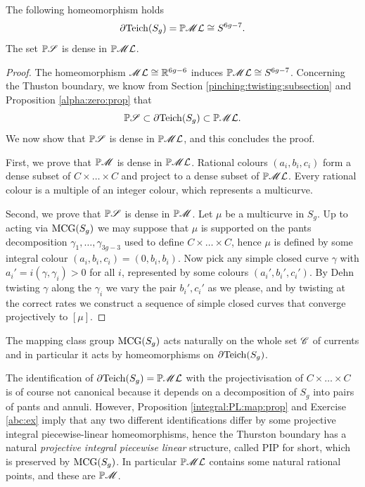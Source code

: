 \begin{teo}
The following homeomorphism holds
$$\partial {\rm Teich}(S_g) = \mathbb{P}\mathscr{M}\mathcal{L} \cong S^{6g-7}.$$ 
The set $\mathbb{P}\mathscr{S}$ is dense in $\mathbb{P}\mathscr{M}\mathcal{L}$.
\end{teo}
\begin{proof}
The homeomorphism $\mathscr{M}\mathcal{L} \cong \mathbb{R}^{6g-6}$ induces $\mathbb{P}\mathscr{M}\mathcal{L} \cong S^{6g-7}$. Concerning the Thuston boundary, we know from Section \ref{pinching:twisting:subsection} and Proposition \ref{alpha:zero:prop} that 
$$\mathbb{P}\mathscr{S} \subset \partial {\rm Teich}(S_g) \subset \mathbb{P}\mathscr{M}\mathcal{L}.$$
We now show that $\mathbb{P}\mathscr{S}$ is dense in $\mathbb{P}\mathscr{M}\mathcal{L}$, and this concludes the proof. 

First, we prove that $\mathbb{P}\mathscr{M}$ is dense in $\mathbb{P}\mathscr{M}\mathcal{L}$. Rational colours $(a_i,b_i,c_i)$ form a dense subset of $C\times \ldots \times C$ and project to a dense subset of $\mathbb{P}\mathscr{M}\mathcal{L}$. Every rational colour is a multiple of an integer colour, which represents a multicurve.

Second, we prove that $\mathbb{P}\mathscr{S}$ is dense in $\mathbb{P}\mathscr{M}$. Let $\mu$ be a multicurve in $S_g$. Up to acting via ${\rm MCG}(S_g)$ we may suppose that $\mu$ is supported on the pants decomposition $\gamma_1,\ldots, \gamma_{3g-3}$ used to define $C\times \ldots \times C$, hence $\mu$ is defined by some integral colour $(a_i,b_i,c_i) = (0,b_i,b_i)$. Now pick any simple closed curve $\gamma$ with $a_i' = i(\gamma, \gamma_i)>0$ for all $i$, represented by some colours $(a_i', b_i', c_i')$. By Dehn twisting $\gamma$ along the $\gamma_i$ we vary the pair $b_i', c_i'$ as we please, and by twisting at the correct rates we construct a sequence of simple closed curves that converge projectively to $[\mu]$.
\end{proof}

The mapping class group ${\rm MCG}(S_g)$ acts naturally on the whole set $\mathscr{C}$ of currents and in particular it acts by homeomorphisms on $\partial {\rm Teich}(S_g)$. 

The identification of $\partial{\rm Teich}(S_g) = \mathbb{P}\mathscr{M}\mathcal{L}$ with the projectivisation of $C\times \ldots \times C$ is of course not canonical because it depends on a decomposition of $S_g$ into pairs of pants and annuli. However, Proposition \ref{integral:PL:map:prop} and Exercise \ref{abc:ex} imply that any two different identifications differ by some projective integral piecewise-linear homeomorphisms, hence the Thurston boundary has a natural \emph{projective integral piecewise linear} structure, called PIP for short, which is preserved by ${\rm MCG}(S_g)$. In particular $\mathbb{P}\mathscr{M}\mathcal{L}$ contains some natural rational points, and these are $\mathbb{P}\mathscr{M}$.

